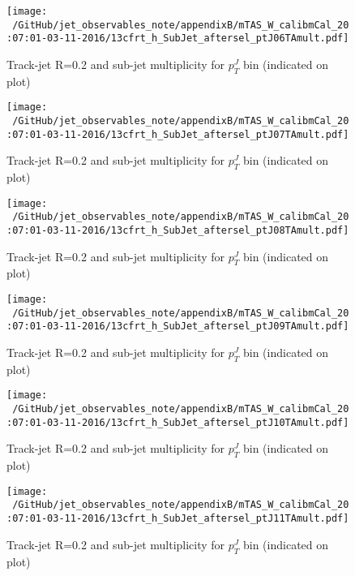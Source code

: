 \begin{figure}
 
\texttt{[image: ~/GitHub/jet\_observables\_note/appendixB/mTAS\_W\_calibmCal\_20:07:01-03-11-2016/13cfrt\_h\_SubJet\_aftersel\_ptJ06TAmult.pdf]}
\caption{Track-jet R=0.2 and sub-jet multiplicity for $p_{T}^{J}$ bin (indicated on plot) }
 
\end{figure}
\begin{figure}
 
\texttt{[image: ~/GitHub/jet\_observables\_note/appendixB/mTAS\_W\_calibmCal\_20:07:01-03-11-2016/13cfrt\_h\_SubJet\_aftersel\_ptJ07TAmult.pdf]}
\caption{Track-jet R=0.2 and sub-jet multiplicity for $p_{T}^{J}$ bin (indicated on plot) }
 
\end{figure}
 
\begin{figure}
 
\texttt{[image: ~/GitHub/jet\_observables\_note/appendixB/mTAS\_W\_calibmCal\_20:07:01-03-11-2016/13cfrt\_h\_SubJet\_aftersel\_ptJ08TAmult.pdf]}
\caption{Track-jet R=0.2 and sub-jet multiplicity for $p_{T}^{J}$ bin (indicated on plot) }
 
\end{figure}

\begin{figure}

\texttt{[image: ~/GitHub/jet\_observables\_note/appendixB/mTAS\_W\_calibmCal\_20:07:01-03-11-2016/13cfrt\_h\_SubJet\_aftersel\_ptJ09TAmult.pdf]}
\caption{Track-jet R=0.2 and sub-jet multiplicity for $p_{T}^{J}$ bin (indicated on plot) }
 
\end{figure}
 
\begin{figure}

\texttt{[image: ~/GitHub/jet\_observables\_note/appendixB/mTAS\_W\_calibmCal\_20:07:01-03-11-2016/13cfrt\_h\_SubJet\_aftersel\_ptJ10TAmult.pdf]}
\caption{Track-jet R=0.2 and sub-jet multiplicity for $p_{T}^{J}$ bin (indicated on plot) }

\end{figure}

\begin{figure}

\texttt{[image: ~/GitHub/jet\_observables\_note/appendixB/mTAS\_W\_calibmCal\_20:07:01-03-11-2016/13cfrt\_h\_SubJet\_aftersel\_ptJ11TAmult.pdf]}
\caption{Track-jet R=0.2 and sub-jet multiplicity for $p_{T}^{J}$ bin (indicated on plot) }

\end{figure}

